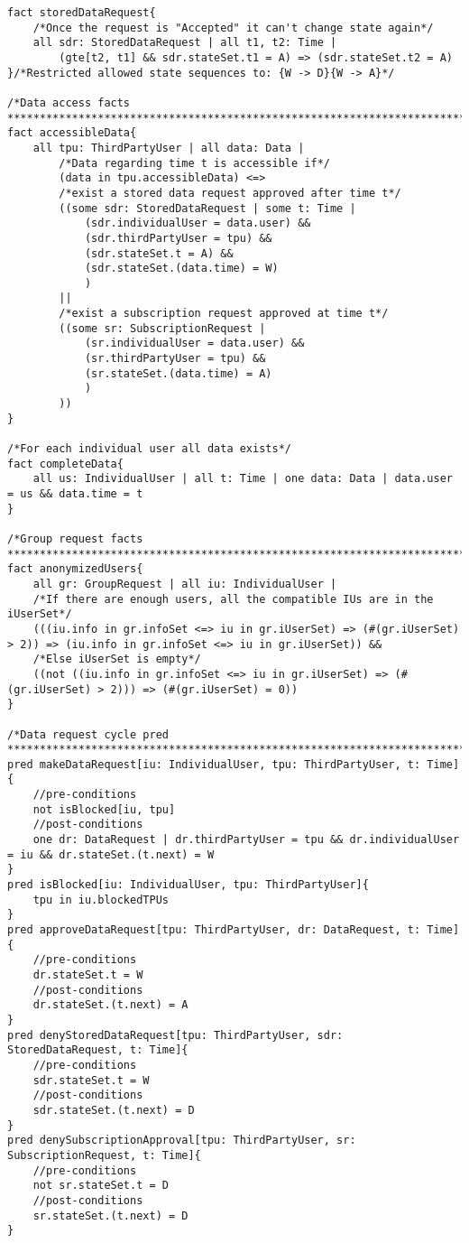 \begin{lstlisting}
fact storedDataRequest{
	/*Once the request is "Accepted" it can't change state again*/
	all sdr: StoredDataRequest | all t1, t2: Time | 
		(gte[t2, t1] && sdr.stateSet.t1 = A) => (sdr.stateSet.t2 = A)
}/*Restricted allowed state sequences to: {W -> D}{W -> A}*/

/*Data access facts
***************************************************************************************************************************************/
fact accessibleData{
	all tpu: ThirdPartyUser | all data: Data |
		/*Data regarding time t is accessible if*/
		(data in tpu.accessibleData) <=> 
		/*exist a stored data request approved after time t*/
		((some sdr: StoredDataRequest | some t: Time |
			(sdr.individualUser = data.user) && 
			(sdr.thirdPartyUser = tpu) &&
			(sdr.stateSet.t = A) &&
			(sdr.stateSet.(data.time) = W)
			)
		||
		/*exist a subscription request approved at time t*/
		((some sr: SubscriptionRequest |
			(sr.individualUser = data.user) && 
			(sr.thirdPartyUser = tpu) &&
			(sr.stateSet.(data.time) = A)
			)
		))
}

/*For each individual user all data exists*/
fact completeData{
	all us: IndividualUser | all t: Time | one data: Data | data.user = us && data.time = t
}

/*Group request facts
***************************************************************************************************************************************/
fact anonymizedUsers{
	all gr: GroupRequest | all iu: IndividualUser |
	/*If there are enough users, all the compatible IUs are in the iUserSet*/
	(((iu.info in gr.infoSet <=> iu in gr.iUserSet) => (#(gr.iUserSet) > 2)) => (iu.info in gr.infoSet <=> iu in gr.iUserSet)) &&
	/*Else iUserSet is empty*/
	((not ((iu.info in gr.infoSet <=> iu in gr.iUserSet) => (#(gr.iUserSet) > 2))) => (#(gr.iUserSet) = 0))
}

/*Data request cycle pred
***************************************************************************************************************************************/
pred makeDataRequest[iu: IndividualUser, tpu: ThirdPartyUser, t: Time]{
	//pre-conditions
	not isBlocked[iu, tpu]
	//post-conditions
	one dr: DataRequest | dr.thirdPartyUser = tpu && dr.individualUser = iu && dr.stateSet.(t.next) = W
}
pred isBlocked[iu: IndividualUser, tpu: ThirdPartyUser]{
	tpu in iu.blockedTPUs
}
pred approveDataRequest[tpu: ThirdPartyUser, dr: DataRequest, t: Time]{
	//pre-conditions
	dr.stateSet.t = W
	//post-conditions
	dr.stateSet.(t.next) = A
}
pred denyStoredDataRequest[tpu: ThirdPartyUser, sdr: StoredDataRequest, t: Time]{
	//pre-conditions
	sdr.stateSet.t = W
	//post-conditions
	sdr.stateSet.(t.next) = D
}
pred denySubscriptionApproval[tpu: ThirdPartyUser, sr: SubscriptionRequest, t: Time]{
	//pre-conditions
	not sr.stateSet.t = D
	//post-conditions
	sr.stateSet.(t.next) = D
}


\end{lstlisting}
